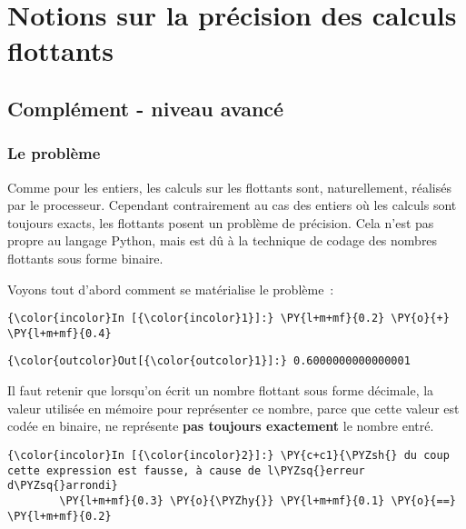     \hypertarget{notions-sur-la-pruxe9cision-des-calculs-flottants}{%
\section{Notions sur la précision des calculs
flottants}\label{notions-sur-la-pruxe9cision-des-calculs-flottants}}

    \hypertarget{compluxe9ment---niveau-avancuxe9}{%
\subsection{Complément - niveau
avancé}\label{compluxe9ment---niveau-avancuxe9}}

    \hypertarget{le-probluxe8me}{%
\subsubsection{Le problème}\label{le-probluxe8me}}

    Comme pour les entiers, les calculs sur les flottants sont,
naturellement, réalisés par le processeur. Cependant contrairement au
cas des entiers où les calculs sont toujours exacts, les flottants
posent un problème de précision. Cela n'est pas propre au langage
Python, mais est dû à la technique de codage des nombres flottants sous
forme binaire.

    Voyons tout d'abord comment se matérialise le problème~:

    \begin{Verbatim}[commandchars=\\\{\}]
{\color{incolor}In [{\color{incolor}1}]:} \PY{l+m+mf}{0.2} \PY{o}{+} \PY{l+m+mf}{0.4}
\end{Verbatim}


\begin{Verbatim}[commandchars=\\\{\}]
{\color{outcolor}Out[{\color{outcolor}1}]:} 0.6000000000000001
\end{Verbatim}
            
    Il faut retenir que lorsqu'on écrit un nombre flottant sous forme
décimale, la valeur utilisée en mémoire pour représenter ce nombre,
parce que cette valeur est codée en binaire, ne représente \textbf{pas
toujours exactement} le nombre entré.

    \begin{Verbatim}[commandchars=\\\{\}]
{\color{incolor}In [{\color{incolor}2}]:} \PY{c+c1}{\PYZsh{} du coup cette expression est fausse, à cause de l\PYZsq{}erreur d\PYZsq{}arrondi}
        \PY{l+m+mf}{0.3} \PY{o}{\PYZhy{}} \PY{l+m+mf}{0.1} \PY{o}{==} \PY{l+m+mf}{0.2}
\end{Verbatim}


